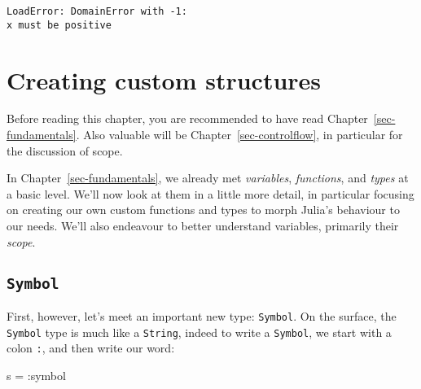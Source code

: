 \documentclass[
  letterpaper,
  DIV=11,
  numbers=noendperiod]{scrreprt}
\newenvironment{Shaded}{\begin{snugshade}}{\end{snugshade}}
\newcommand{\NormalTok}[1]{\textcolor[rgb]{0.00,0.23,0.31}{#1}}
\newcommand{\OperatorTok}[1]{\textcolor[rgb]{0.37,0.37,0.37}{#1}}
\begin{document}
\begin{verbatim}
LoadError: DomainError with -1:
x must be positive
\end{verbatim}

\hypertarget{sec-customstructures}{%
\chapter{Creating custom structures}\label{sec-customstructures}}

\begin{tcolorbox}[enhanced jigsaw, toprule=.15mm, opacitybacktitle=0.6, leftrule=.75mm, breakable, coltitle=black, bottomrule=.15mm, colbacktitle=quarto-callout-important-color!10!white, bottomtitle=1mm, rightrule=.15mm, title=\textcolor{quarto-callout-important-color}{\faExclamation}\hspace{0.5em}{Prerequisites}, colframe=quarto-callout-important-color-frame, left=2mm, colback=white, opacityback=0, arc=.35mm, toptitle=1mm, titlerule=0mm]

Before reading this chapter, you are recommended to have read
Chapter~\ref{sec-fundamentals}. Also valuable will be
Chapter~\ref{sec-controlflow}, in particular for the discussion of
scope.

\end{tcolorbox}

In Chapter~\ref{sec-fundamentals}, we already met \emph{variables},
\emph{functions}, and \emph{types} at a basic level. We'll now look at
them in a little more detail, in particular focusing on creating our own
custom functions and types to morph Julia's behaviour to our needs.
We'll also endeavour to better understand variables, primarily their
\emph{scope}.

\hypertarget{symbol}{%
\section{\texorpdfstring{\texttt{Symbol}}{Symbol}}\label{symbol}}

First, however, let's meet an important new type: \texttt{Symbol}. On
the surface, the \texttt{Symbol} type is much like a \texttt{String},
indeed to write a \texttt{Symbol}, we start with a colon \texttt{:}, and
then write our word:

\begin{Shaded}
\begin{Highlighting}[]
\NormalTok{s }\OperatorTok{=} \OperatorTok{:}\NormalTok{symbol}
\end{Highlighting}
\end{Shaded}
\end{document}
